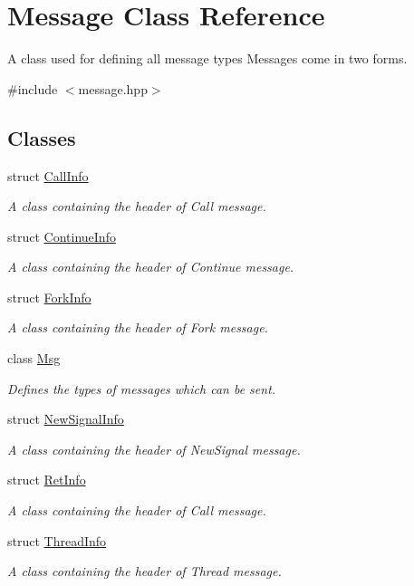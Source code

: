 \hypertarget{class_message}{}\section{Message Class Reference}
\label{class_message}


A class used for defining all message types Messages come in two forms.  




{\ttfamily \#include $<$message.\+hpp$>$}

\subsection*{Classes}
\begin{DoxyCompactItemize}
\item 
struct \hyperlink{struct_message_1_1_call_info}{Call\+Info}
\begin{DoxyCompactList}\small\item\em A class containing the header of Call message. \end{DoxyCompactList}\item 
struct \hyperlink{struct_message_1_1_continue_info}{Continue\+Info}
\begin{DoxyCompactList}\small\item\em A class containing the header of Continue message. \end{DoxyCompactList}\item 
struct \hyperlink{struct_message_1_1_fork_info}{Fork\+Info}
\begin{DoxyCompactList}\small\item\em A class containing the header of Fork message. \end{DoxyCompactList}\item 
class \hyperlink{class_message_1_1_msg}{Msg}
\begin{DoxyCompactList}\small\item\em Defines the types of messages which can be sent. \end{DoxyCompactList}\item 
struct \hyperlink{struct_message_1_1_new_signal_info}{New\+Signal\+Info}
\begin{DoxyCompactList}\small\item\em A class containing the header of New\+Signal message. \end{DoxyCompactList}\item 
struct \hyperlink{struct_message_1_1_ret_info}{Ret\+Info}
\begin{DoxyCompactList}\small\item\em A class containing the header of Call message. \end{DoxyCompactList}\item 
struct \hyperlink{struct_message_1_1_thread_info}{Thread\+Info}
\begin{DoxyCompactList}\small\item\em A class containing the header of Thread message. \end{DoxyCompactList}\end{DoxyCompactItemize}
